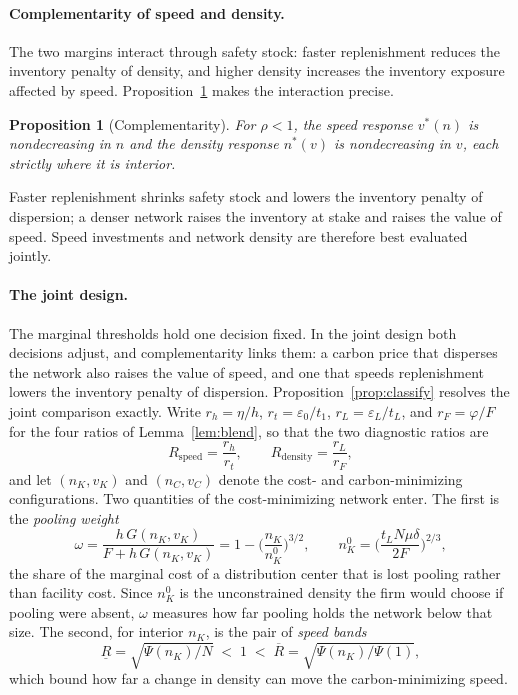 \documentclass[11pt]{article}
\newtheorem{proposition}{Proposition}
\theoremstyle{definition}
\theoremstyle{remark}
\theoremstyle{plain}
\begin{document}
\paragraph{Complementarity of speed and density.} The two margins interact through safety stock: faster
replenishment reduces the inventory penalty of density, and higher density increases the inventory exposure
affected by speed. Proposition~\ref{prop:complement} makes the interaction precise.

\begin{proposition}[Complementarity]\label{prop:complement}
For $\rho<1$, the speed response $v^*(n)$ is nondecreasing in $n$ and the density response $n^*(v)$ is
nondecreasing in $v$, each strictly where it is interior.
\end{proposition}

\noindent Faster replenishment shrinks safety stock and lowers the inventory penalty of dispersion; a denser
network raises the inventory at stake and raises the value of speed. Speed investments and network density are
therefore best evaluated jointly.

\paragraph{The joint design.} The marginal thresholds hold one decision fixed. In the joint design both
decisions adjust, and complementarity links them: a carbon price that disperses the network also raises the
value of speed, and one that speeds replenishment lowers the inventory penalty of dispersion.
Proposition~\ref{prop:classify} resolves the joint comparison exactly. Write
$r_h=\eta/h$, $r_t=\varepsilon_0/t_1$, $r_L=\varepsilon_L/t_L$, and $r_F=\varphi/F$ for the four ratios of
Lemma~\ref{lem:blend}, so that the two diagnostic ratios are
\[
  R_{\mathrm{speed}}=\frac{r_h}{r_t},\qquad R_{\mathrm{density}}=\frac{r_L}{r_F},
\]
and let $(n_K,v_K)$ and $(n_C,v_C)$ denote the cost- and carbon-minimizing configurations. Two quantities of
the cost-minimizing network enter. The first is the \emph{pooling weight}
\begin{equation}\label{eq:poolweight}
  \omega=\frac{h\,G(n_K,v_K)}{F+h\,G(n_K,v_K)}=1-\Big(\frac{n_K}{n_K^0}\Big)^{3/2},
  \qquad n_K^0=\Big(\frac{t_LN\mu\delta}{2F}\Big)^{2/3},
\end{equation}
the share of the marginal cost of a distribution center that is lost pooling rather than facility cost. Since
$n_K^0$ is the unconstrained density the firm would choose if pooling were absent, $\omega$ measures how far
pooling holds the network below that size. The second, for interior $n_K$, is the pair of \emph{speed bands}
\begin{equation}\label{eq:speedbands}
  \underline R=\sqrt{\Psi(n_K)/N}\;<\;1\;<\;\overline R=\sqrt{\Psi(n_K)/\Psi(1)},
\end{equation}
which bound how far a change in density can move the carbon-minimizing speed.
\end{document}
